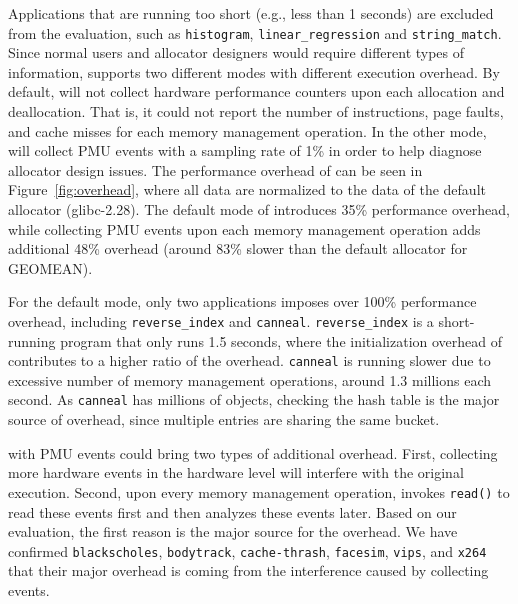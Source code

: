 Applications that are running too short (e.g., less than 1 seconds) are excluded from the evaluation, such as \texttt{histogram}, \texttt{linear\_regression} and \texttt{string\_match}. 
Since normal users and allocator designers would require different types of information, \MP{} supports two different modes with different execution overhead. By default, \MP{} will not collect hardware performance counters upon each allocation and deallocation. That is, it could not report the number of instructions, page faults, and cache misses for each memory management operation. In the other mode, \MP{} will collect PMU events with a sampling rate of 1\% in order to help diagnose allocator design issues. 
The performance overhead of \MP{} can be seen in Figure~\ref{fig:overhead}, where all data are normalized to the data of the default allocator (glibc-2.28). The default mode of \MP{} introduces 35\% performance overhead, while collecting PMU events upon each memory management operation adds additional 48\% overhead (around 83\% slower than the default allocator for GEOMEAN). 

For the default mode, only two applications imposes over 100\% performance overhead, including \texttt{reverse\_index} and \texttt{canneal}. \texttt{reverse\_index} is a short-running program that only runs 1.5 seconds, where the initialization overhead of \MP{} contributes to a higher ratio of the overhead. \texttt{canneal} is running slower due to excessive number of memory management operations, around 1.3 millions each second. As \texttt{canneal} has millions of objects, checking the hash table is the major source of overhead, since multiple entries are sharing the same bucket. 

\MP{} with PMU events could bring two types of additional overhead. First, collecting more hardware events in the hardware level will interfere with the original execution. Second, upon every memory management operation, \MP{} invokes \texttt{read()} to read these events first and then analyzes these events later. Based on our evaluation, the first reason is the major source for the overhead. We have confirmed  \texttt{blackscholes}, \texttt{bodytrack}, \texttt{cache-thrash}, \texttt{facesim}, \texttt{vips}, and \texttt{x264} that their major overhead is coming from the interference caused by collecting events. 


